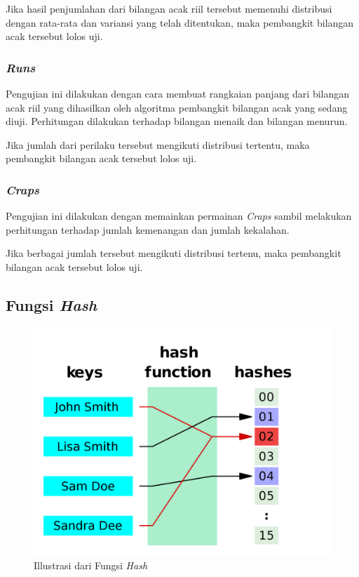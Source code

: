 \documentclass[conference]{IEEEtran}
\newcommand{\en}[1]
    {\foreignlanguage{english}{\textit{#1}}}
\begin{document}
Jika hasil penjumlahan dari bilangan acak riil tersebut memenuhi distribusi dengan rata-rata dan variansi yang telah ditentukan, maka pembangkit bilangan acak tersebut lolos uji.

\subsubsection{\en{Runs}}

Pengujian ini dilakukan dengan cara membuat rangkaian panjang dari bilangan acak riil yang dihasilkan oleh algoritma pembangkit bilangan acak yang sedang diuji.
Perhitungan dilakukan terhadap bilangan menaik dan bilangan menurun.

Jika jumlah dari perilaku tersebut mengikuti distribusi tertentu, maka pembangkit bilangan acak tersebut lolos uji.

\subsubsection{\en{Craps}}

Pengujian ini dilakukan dengan memainkan permainan \en{Craps} sambil melakukan perhitungan terhadap jumlah kemenangan dan jumlah kekalahan.

Jika berbagai jumlah tersebut mengikuti distribusi tertenu, maka pembangkit bilangan acak tersebut lolos uji.

\subsection{Fungsi \en{Hash}}

\begin{figure}[htbp]
    \includegraphics[width=\linewidth]{img/teori-hash-graph.png}
    \caption{Illustrasi dari Fungsi \en{Hash}}
    \label{fig:teori:hash}
\end{figure}
\end{document}
